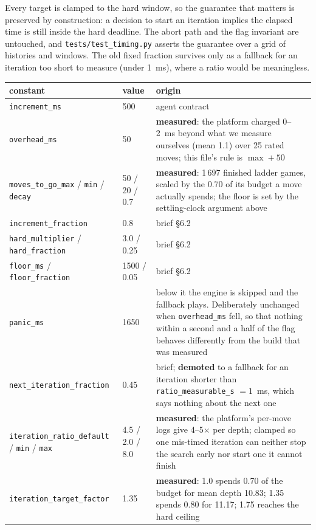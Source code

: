\documentclass[11pt,a4paper]{article}
\newcommand{\code}[1]{\texttt{#1}}
\begin{document}
Every target is clamped to the hard window, so the guarantee that matters is preserved by construction: a
decision to start an iteration implies the elapsed time is still inside the hard deadline. The abort path
and the flag invariant are untouched, and \code{tests/test\_timing.py} asserts the guarantee over a grid
of histories and windows. The old fixed fraction survives only as a fallback for an iteration too short to
measure (under 1~ms), where a ratio would be meaningless.

\begin{table}[H]\centering\small
\begin{tabular}{@{}ll>{\raggedright\arraybackslash}p{7.6cm}@{}}
\toprule
constant & value & origin \\
\midrule
\code{increment\_ms} & 500 & agent contract \\
\code{overhead\_ms} & 50 & \textbf{measured}: the platform charged 0--2~ms beyond what we measure ourselves (mean 1.1) over 25 rated moves; this file's rule is $\max + 50$ \\
\code{moves\_to\_go\_max} / \code{min} / \code{decay} & 50 / 20 / 0.7 & \textbf{measured}: 1\,697 finished ladder games, scaled by the 0.70 of its budget a move actually spends; the floor is set by the settling-clock argument above \\
\code{increment\_fraction} & 0.8 & brief \S 6.2 \\
\code{hard\_multiplier} / \code{hard\_fraction} & 3.0 / 0.25 & brief \S 6.2 \\
\code{floor\_ms} / \code{floor\_fraction} & 1500 / 0.05 & brief \S 6.2 \\
\code{panic\_ms} & 1650 & below it the engine is skipped and the fallback plays. Deliberately unchanged when \code{overhead\_ms} fell, so that nothing within a second and a half of the flag behaves differently from the build that was measured \\
\code{next\_iteration\_fraction} & 0.45 & brief; \textbf{demoted} to a fallback for an iteration shorter than \code{ratio\_measurable\_s} $= 1$~ms, which says nothing about the next one \\
\code{iteration\_ratio\_default} / \code{min} / \code{max} & 4.5 / 2.0 / 8.0 & \textbf{measured}: the platform's per-move logs give 4--5$\times$ per depth; clamped so one mis-timed iteration can neither stop the search early nor start one it cannot finish \\
\code{iteration\_target\_factor} & 1.35 & \textbf{measured}: 1.0 spends 0.70 of the budget for mean depth 10.83; 1.35 spends 0.80 for 11.17; 1.75 reaches the hard ceiling \\

\end{tabular}
\end{table}
\end{document}

